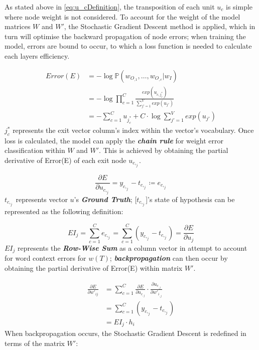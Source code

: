 As stated above in \autoref{eq:u_cDefinition}, the transposition of each unit $u_{c}$ is simple where node weight is not considered. To account for the weight of the model matrices $W$ and $W'$, the Stochastic Gradient Descent method is applied, which in turn will optimise the backward propagation of node errors; when training the model, errors are bound to occur, to which a loss function is needed to calculate each layers efficiency.

\begin{equation}
    \begin{split}
        Error (E) & = - \log \mathbb{P} (w_{O_,{_1}} , \ldots, w_{O_{,c}} | w_{I}) \\
                  & = - \log \prod_{c=1}^{C} \frac{exp(u_{c,j_{c}^{*}})}{\sum_{j'=1}^{V} exp(u_{j'})}  \\
                  & = - \sum_{c=1}^{C} u_{j_{c}^{*}} + C \cdot \log \sum_{j'=1} ^ {V} exp(u_{j'})
    \end{split}
\end{equation}
${j_{c}^{*}}$ represents the exit vector column's index within the vector's vocabulary. Once loss is calculated, the model can apply the \textbf{\textit{chain rule}} for weight error classification within $W$ and $W'$. This is achieved by obtaining the partial derivative of Error(E) of each exit node $u_{c,_j}$.

\begin{equation}
    \frac{\partial E}{\partial u_{c,_j}} = y_{c,_j} - t_{c,_j} \coloneqq e_{c,_j}
\end{equation}
$t_{c,_j}$ represents vector $u$'s \textbf{\textit{Ground Truth}}; [$t_{c,_j}$]'s state of hypothesis can be represented as the following definition:

\begin{equation}
    EI_j = \sum_{c=1}^{C} e_{c,_j} = \sum_{c=1}^{C} (y_{c,_j} - t_{c,_j}) = \frac{\partial E}{\partial u_{j}}
\end{equation}
$EI_{j}$ represents the \textbf{\textit{Row-Wise Sum}} as a column vector in attempt to account for word context errors for $w(T)$; \textbf{\textit{backpropagation}} can then occur by obtaining the partial derivative of Error(E) within matrix $W'$.

\begin{equation} \label{}
    \begin{split}
        \frac{\partial E}{\partial w'_{ij}} & = \sum_{c=1}^{C} \frac{\partial E}{\partial u_{c_{,j}}} \cdot \frac{\partial u_{c_{,j}}}{\partial w'_{i_{,j}}} \\
                                            & = \sum_{c=1}^{C} (y_{c,_j} - t_{c,_j}) \\
                                            & = EI_{j} \cdot h_{i}
    \end{split}
\end{equation}
When backpropagation occurs, the Stochastic Gradient Descent is redefined in terms of the matrix $W'$:

